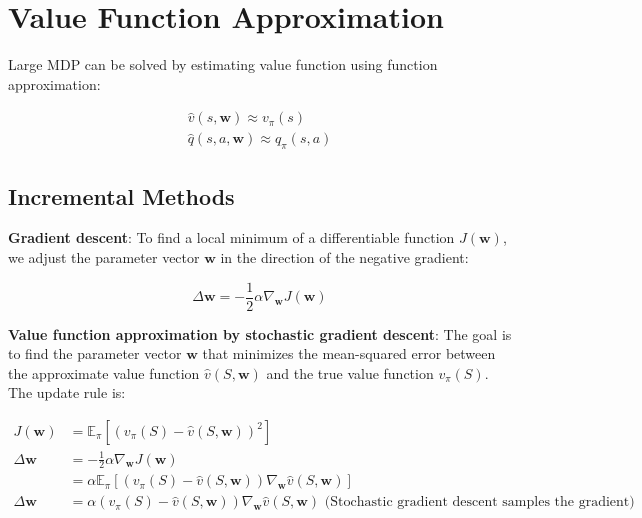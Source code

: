 \section{Value Function Approximation}

Large MDP can be solved by estimating value function using function
approximation:

\begin{gather*}
    \hat{v}(s, \mathbf{w}) \approx v_\pi(s) \\
    \hat{q}(s, a, \mathbf{w}) \approx q_\pi(s, a)
\end{gather*}

\subsection{Incremental Methods}

\noindent \textbf{Gradient descent}: To find a local minimum of a differentiable function
$J(\mathbf{w})$, we adjust the parameter vector $\mathbf{w}$ in the direction
of the negative gradient:

\begin{equation*}
    \Delta \mathbf{w} = -\frac{1}{2} \alpha \nabla_\mathbf{w} J(\mathbf{w})
\end{equation*}

\noindent \textbf{Value function approximation by stochastic gradient descent}: The goal
is to find the parameter vector $\mathbf{w}$ that minimizes the mean-squared error between
the approximate value function $\hat{v}(S, \mathbf{w})$ and the true value function $v_\pi(S)$.
The update rule is:

\begin{align*}
    J(\mathbf{w})     & = \mathbb{E}_\pi \left[ \left( v_\pi(S) - \hat{v}(S, \mathbf{w}) \right)^2 \right]                                                               \\
    \Delta \mathbf{w} & = -\frac{1}{2} \alpha \nabla_\mathbf{w} J(\mathbf{w})                                                                                            \\
                      & = \alpha \mathbb{E}_\pi \left[ (v_\pi(S) - \hat{v}(S, \mathbf{w})) \nabla_\mathbf{w} \hat{v}(S, \mathbf{w}) \right]                              \\
    \Delta \mathbf{w} & = \alpha (v_\pi(S) - \hat{v}(S, \mathbf{w})) \nabla_\mathbf{w} \hat{v}(S, \mathbf{w}) \text{ (Stochastic gradient descent samples the gradient)}
\end{align*}


